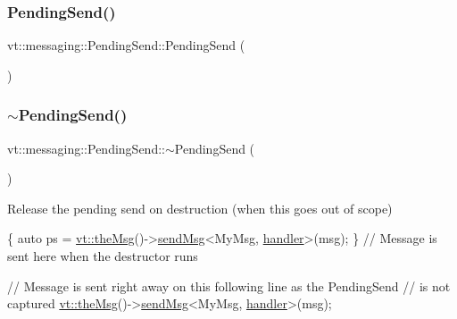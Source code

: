 \mbox{\label{structvt_1_1messaging_1_1_pending_send_a951912c336cf3cdaf91f8ccde13092af}} 
\subsubsection{\texorpdfstring{Pending\+Send()}{PendingSend()}\hspace{0.1cm}{\footnotesize\ttfamily [6/6]}}
{\footnotesize\ttfamily vt\+::messaging\+::\+Pending\+Send\+::\+Pending\+Send (\begin{DoxyParamCaption}\item[{const \hyperlink{structvt_1_1messaging_1_1_pending_send}{Pending\+Send} \&}]{ }\end{DoxyParamCaption})\hspace{0.3cm}{\ttfamily [delete]}}

\mbox{\label{structvt_1_1messaging_1_1_pending_send_ade803ff2903a92eaf62b6e330593871b}} 
\subsubsection{\texorpdfstring{$\sim$\+Pending\+Send()}{~PendingSend()}}
{\footnotesize\ttfamily vt\+::messaging\+::\+Pending\+Send\+::$\sim$\+Pending\+Send (\begin{DoxyParamCaption}{ }\end{DoxyParamCaption})\hspace{0.3cm}{\ttfamily [inline]}}



Release the pending send on destruction (when this goes out of scope) 


\begin{DoxyCode}
\{
  \textcolor{keyword}{auto} ps = \hyperlink{namespacevt_aeafd31f866aeb4dc6fc2f6ee97136350}{vt::theMsg}()->\hyperlink{group__preregister_ga0162a39473e7f9b490a79a7983d949ac}{sendMsg}<MyMsg, \hyperlink{namespacevt_1_1config_a6bd1d6215bda0d8ca02811798399f689a82a0081a94d5c5dfd18b0b3f7eca64b7}{handler}>(msg);
\} \textcolor{comment}{// Message is sent here when the destructor runs}

\textcolor{comment}{// Message is sent right away on this following line as the PendingSend}
\textcolor{comment}{// is not captured}
\hyperlink{namespacevt_aeafd31f866aeb4dc6fc2f6ee97136350}{vt::theMsg}()->\hyperlink{group__preregister_ga0162a39473e7f9b490a79a7983d949ac}{sendMsg}<MyMsg, \hyperlink{namespacevt_1_1config_a6bd1d6215bda0d8ca02811798399f689a82a0081a94d5c5dfd18b0b3f7eca64b7}{handler}>(msg);
\end{DoxyCode}
 

